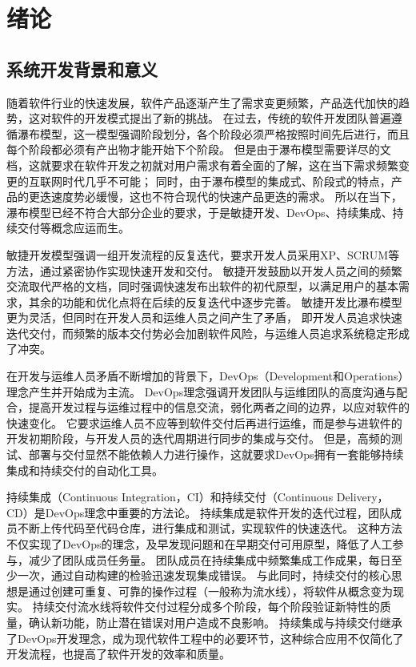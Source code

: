 
\chapter{绪论}

\section{系统开发背景和意义}
随着软件行业的快速发展，软件产品逐渐产生了需求变更频繁，产品迭代加快的趋势，这对软件的开发模式提出了新的挑战。
在过去，传统的软件开发团队普遍遵循瀑布模型，这一模型强调阶段划分，各个阶段必须严格按照时间先后进行，而且每个阶段都必须有产出物才能开始下个阶段\cite{瀑布模型}。
但是由于瀑布模型需要详尽的文档，这就要求在软件开发之初就对用户需求有着全面的了解，这在当下需求频繁变更的互联网时代几乎不可能；
同时，由于瀑布模型的集成式、阶段式的特点，产品的更迭速度势必缓慢，这也不符合现代的快速产品更迭的需求。
所以在当下，瀑布模型已经不符合大部分企业的要求，于是敏捷开发、DevOps、持续集成、持续交付等概念应运而生。

敏捷开发模型强调一组开发流程的反复迭代，要求开发人员采用XP、SCRUM等方法，通过紧密协作实现快速开发和交付。
敏捷开发鼓励以开发人员之间的频繁交流取代严格的文档，同时强调快速发布出软件的初代原型，以满足用户的基本需求，其余的功能和优化点将在后续的反复迭代中逐步完善\cite{敏捷开发}。
敏捷开发比瀑布模型更为灵活，但同时在开发人员和运维人员之间产生了矛盾，
即开发人员追求快速迭代交付，而频繁的版本交付势必会加剧软件风险，与运维人员追求系统稳定形成了冲突。

在开发与运维人员矛盾不断增加的背景下，DevOps（Development和Operations）理念产生并开始成为主流。
DevOps理念强调开发团队与运维团队的高度沟通与配合，提高开发过程与运维过程中的信息交流，弱化两者之间的边界，以应对软件的快速变化\cite{DevOps}。
它要求运维人员不应等到软件交付后再进行运维，而是参与进软件的开发初期阶段，与开发人员的迭代周期进行同步的集成与交付。
但是，高频的测试、部署与交付显然不能依赖人力进行操作，这就要求DevOps拥有一套能够持续集成和持续交付的自动化工具。

持续集成（Continuous Integration，CI）和持续交付（Continuous Delivery，CD）是DevOps理念中重要的方法论。
持续集成是软件开发的迭代过程，团队成员不断上传代码至代码仓库，进行集成和测试，实现软件的快速迭代\cite{绪论持续集成1}。
这种方法不仅实现了DevOps的理念，及早发现问题和在早期交付可用原型，降低了人工参与，减少了团队成员任务量。
团队成员在持续集成中频繁集成工作成果，每日至少一次，通过自动构建的检验迅速发现集成错误。
与此同时，持续交付的核心思想是通过创建可重复、可靠的操作过程（一般称为流水线），将软件从概念变为现实\cite{绪论持续集成2}。
持续交付流水线将软件交付过程分成多个阶段，每个阶段验证新特性的质量，确认新功能，防止潜在错误对用户造成不良影响。
持续集成与持续交付继承了DevOps开发理念，成为现代软件工程中的必要环节，这种综合应用不仅简化了开发流程，也提高了软件开发的效率和质量。

